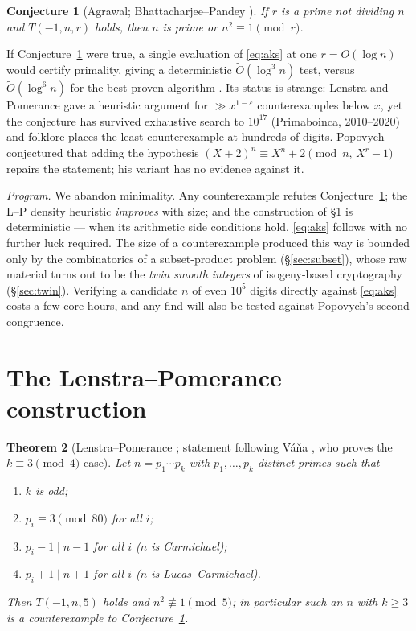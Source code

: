 \documentclass[11pt]{article}
\newtheorem{theorem}{Theorem}[section]
\newtheorem{conjecture}[theorem]{Conjecture}
\theoremstyle{remark}
\begin{document}
\begin{conjecture}[Agrawal; Bhattacharjee--Pandey \cite{BP01}]\label{conj:agrawal}
If $r$ is a prime not dividing $n$ and $T(-1,n,r)$ holds, then $n$ is prime or
$n^2 \equiv 1 \pmod r$.
\end{conjecture}

If Conjecture~\ref{conj:agrawal} were true, a single evaluation of
\eqref{eq:aks} at one $r = O(\log n)$ would certify primality, giving a
deterministic $\tilde O(\log^3 n)$ test, versus $\tilde O(\log^6 n)$ for the
best proven algorithm \cite{LP2019}. Its status is strange: Lenstra and
Pomerance \cite{LPremarks} gave a heuristic argument for $\gg x^{1-\varepsilon}$
counterexamples below $x$, yet the conjecture has survived exhaustive search to
$10^{17}$ (Primaboinca, 2010--2020) and folklore places the least counterexample
at hundreds of digits. Popovych \cite{Popovych09} conjectured that adding the
hypothesis $(X+2)^n \equiv X^n+2 \pmod{n,\,X^r-1}$ repairs the statement; his
variant has no evidence against it.

\emph{Program.} We abandon minimality. Any counterexample refutes
Conjecture~\ref{conj:agrawal}; the L--P density heuristic \emph{improves} with
size; and the construction of \S\ref{sec:lp} is deterministic --- when its
arithmetic side conditions hold, \eqref{eq:aks} follows with no further luck
required. The size of a counterexample produced this way is bounded only by the
combinatorics of a subset-product problem (\S\ref{sec:subset}), whose raw
material turns out to be the \emph{twin smooth integers} of isogeny-based
cryptography (\S\ref{sec:twin}). Verifying a candidate $n$ of even $10^5$
digits directly against \eqref{eq:aks} costs a few core-hours, and any find
will also be tested against Popovych's second congruence.

\section{The Lenstra--Pomerance construction}\label{sec:lp}

\begin{theorem}[Lenstra--Pomerance \cite{LPremarks}; statement following
V\'a\v{n}a \cite{Vana09}, who proves the $k \equiv 3 \pmod 4$ case]
\label{thm:lp}
Let $n = p_1 \cdots p_k$ with $p_1, \dots, p_k$ distinct primes such that
\begin{enumerate}\itemsep1pt
\item[(a)] $k$ is odd;
\item[(b)] $p_i \equiv 3 \pmod{80}$ for all $i$;
\item[(c)] $p_i - 1 \mid n - 1$ for all $i$ \hfill ($n$ is Carmichael);
\item[(d)] $p_i + 1 \mid n + 1$ for all $i$ \hfill ($n$ is Lucas--Carmichael).
\end{enumerate}
Then $T(-1,n,5)$ holds and $n^2 \not\equiv 1 \pmod 5$; in particular such an
$n$ with $k \ge 3$ is a counterexample to Conjecture~\ref{conj:agrawal}.
\end{theorem}
\end{document}

